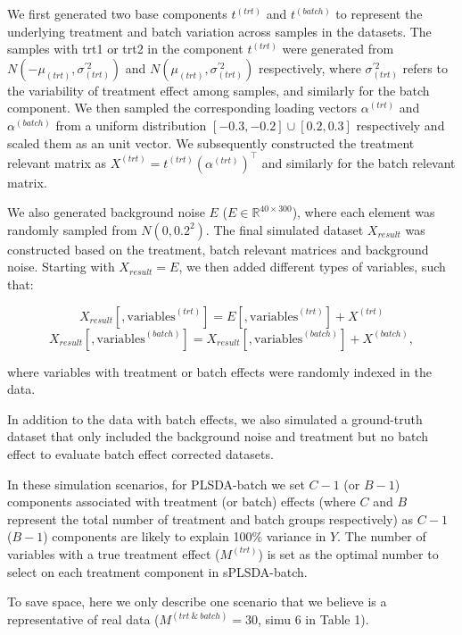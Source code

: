\documentclass[
]{book}
\begin{document}
We first generated two base components \(t^{(trt)}\) and \(t^{(batch)}\) to represent the underlying treatment and batch variation across samples in the datasets. The samples with trt1 or trt2 in the component \(t^{(trt)}\) were generated from \(N(-\mu_{(trt)}, \sigma^{'2}_{(trt)})\) and \(N(\mu_{(trt)}, \sigma^{'2}_{(trt)})\) respectively, where \(\sigma^{'2}_{(trt)}\) refers to the variability of treatment effect among samples, and similarly for the batch component. We then sampled the corresponding loading vectors \(\alpha^{(trt)}\) and \(\alpha^{(batch)}\) from a uniform distribution \([-0.3, -0.2]\cup [0.2,0.3]\) respectively and scaled them as an unit vector. We subsequently constructed the treatment relevant matrix as \(X^{(trt)} = t^{(trt)}(\alpha^{(trt)})^{\top}\) and similarly for the batch relevant matrix.

We also generated background noise \(E\) (\(E \in \mathbb{R}^{40 \times 300}\)), where each element was randomly sampled from \(N(0, 0.2^{2})\). The final simulated dataset \(X_{result}\) was constructed based on the treatment, batch relevant matrices and background noise. Starting with \(X_{result} = E\), we then added different types of variables, such that:

\small

\[X_{result}[ ,\mbox{variables}^{(trt)}] = E[ ,\mbox{variables}^{(trt)}] + X^{(trt)}\]
\[X_{result}[ ,\mbox{variables}^{(batch)}] = X_{result}[ ,\mbox{variables}^{(batch)}] + X^{(batch)},\] \normalsize

\noindent where variables with treatment or batch effects were randomly indexed in the data.

In addition to the data with batch effects, we also simulated a ground-truth dataset that only included the background noise and treatment but no batch effect to evaluate batch effect corrected datasets.

In these simulation scenarios, for PLSDA-batch we set \(C-1\) (or \(B-1\)) components associated with treatment (or batch) effects (where \(C\) and \(B\) represent the total number of treatment and batch groups respectively) as \(C-1\) (\(B-1\)) components are likely to explain 100\% variance in \(Y\). The number of variables with a true treatment effect (\(M^{(trt)}\)) is set as the optimal number to select on each treatment component in sPLSDA-batch.

To save space, here we only describe one scenario that we believe is a representative of real data (\(M^{(trt \ \& \ batch)} = 30\), simu 6 in Table 1).
\end{document}

